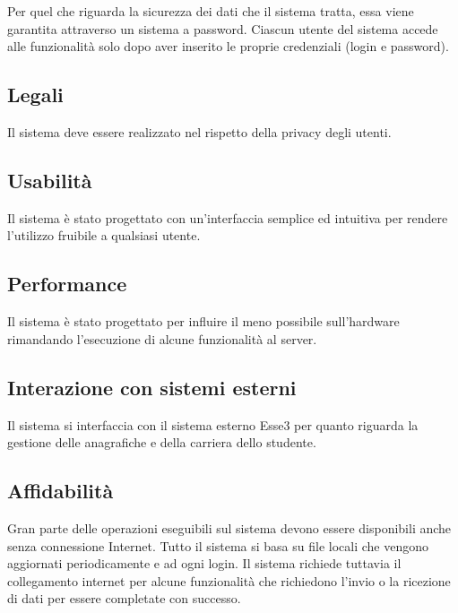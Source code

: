 Per quel che riguarda la sicurezza dei dati che il sistema tratta, essa viene garantita attraverso un sistema a password. Ciascun utente del sistema accede alle funzionalità solo dopo aver inserito le proprie credenziali (login e password).

\subsection{Legali}
Il sistema deve essere realizzato nel rispetto della privacy degli utenti.

\subsection{Usabilità}
 
Il sistema è stato progettato con un’interfaccia semplice ed intuitiva per rendere l’utilizzo fruibile a qualsiasi utente.

\subsection{Performance}

Il sistema è stato progettato per influire il meno possibile sull’hardware rimandando l’esecuzione di alcune funzionalità al server.

\subsection{Interazione con sistemi esterni}
 
Il sistema si interfaccia con il sistema esterno Esse3 per quanto riguarda la gestione delle anagrafiche e della carriera dello studente.

\subsection{Affidabilità}
 
Gran parte delle operazioni eseguibili sul sistema devono essere disponibili anche senza connessione Internet. Tutto il sistema si basa su file locali che vengono aggiornati periodicamente e ad ogni login. Il sistema richiede tuttavia il collegamento internet per alcune funzionalità che richiedono l’invio o la ricezione di dati per essere completate con successo.
\begin{comment}
\section{Pseudorequisiti e vincoli}
\paragraph{Sostituire con gli pseudorequisiti e vincoli da rispettare \\}
Lorem ipsum dolor sit amet...
\end{comment}
